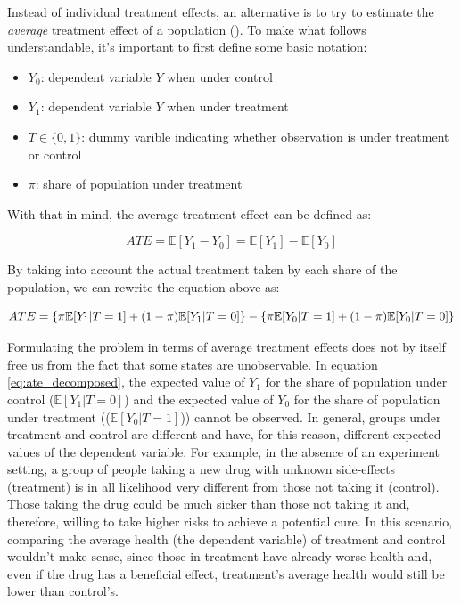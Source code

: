 Instead of individual treatment effects, an alternative is to try to estimate the \textit{average} treatment effect of a population (\cite{morganCounterfactualsCausalInference2015}). To make what follows understandable, it's important to first define some basic notation:

\begin{itemize}
  \item $Y_0$: dependent variable $Y$ when under control
  \item $Y_1$: dependent variable $Y$ when under treatment
  \item $T \in \{0,1\}$: dummy varible indicating whether observation is under treatment or control
  \item $\pi$: share of population under treatment
\end{itemize}

With that in mind, the average treatment effect can be defined as:

\begin{equation}
  ATE = \mathbb{E}[Y_1 - Y_0] = \mathbb{E}[Y_1] - \mathbb{E}[Y_0]
\end{equation}

By taking into account the actual treatment taken by each share of the population, we can rewrite the equation above as:

\begin{equation}
  \label{eq:ate_decomposed}
    ATE = \{\pi \mathbb{E}[Y_1 | T = 1] + (1-\pi) \mathbb{E}[Y_1 | T = 0]\} \\
    - \{\pi \mathbb{E}[Y_0 | T = 1] + (1-\pi) \mathbb{E}[Y_0 | T = 0]\}
\end{equation}

Formulating the problem in terms of average treatment effects does not by itself free us from the fact that some states are unobservable. In equation \ref{eq:ate_decomposed}, the expected value of $Y_1$ for the share of population under control  ($\mathbb{E}[Y_1 | T = 0]$)  and the expected value of $Y_0$ for the share of population under treatment (($\mathbb{E}[Y_0 | T = 1]$)) cannot be observed. In general, groups under treatment and control are different and have, for this reason, different expected values of the dependent variable. For example, in the absence of an experiment setting, a group of people taking a new drug with unknown side-effects (treatment) is in all likelihood very different from those not taking it (control). Those taking the drug could be much sicker than those not taking it and, therefore, willing to take higher risks to achieve a potential cure. In this scenario, comparing the average health (the dependent variable) of treatment and control wouldn't make sense, since those in treatment have already worse health and, even if the drug has a beneficial effect, treatment's average health would still be lower than control's.


